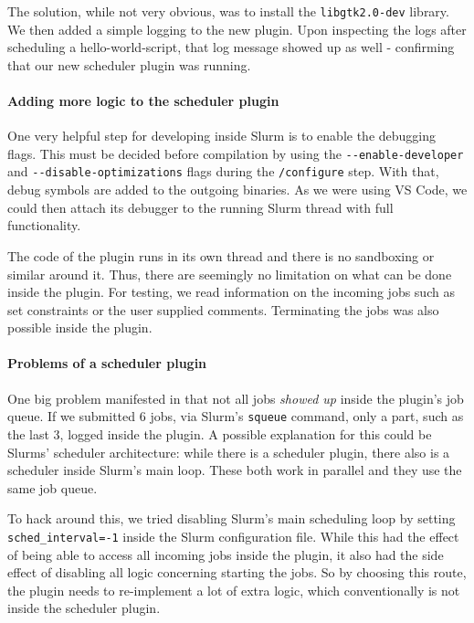 The solution, while not very obvious, was to install the \verb|libgtk2.0-dev| library.
We then added a simple logging to the new plugin. Upon inspecting the logs after scheduling a hello-world-script, that log message showed up as well - confirming that our new scheduler plugin was running.

\paragraph{Adding more logic to the scheduler plugin}

One very helpful step for developing inside Slurm is to enable the debugging flags.
This must be decided before compilation by using the \verb|--enable-developer| and \verb|--disable-optimizations| flags during the \verb|/configure| step. 
With that, debug symbols are added to the outgoing binaries. 
As we were using VS Code, we could then attach its debugger to the running Slurm thread with full functionality.

The code of the plugin runs in its own thread and there is no sandboxing or similar around it.
Thus, there are seemingly no limitation on what can be done inside the plugin. 
For testing, we read information on the incoming jobs such as set constraints or the user supplied comments. Terminating the jobs was also possible inside the plugin.

\paragraph{Problems of a scheduler plugin}

One big problem manifested in that not all jobs \emph{showed up} inside the plugin's job queue. 
If we submitted 6 jobs, via Slurm's \verb|squeue| command, only a part, such as the last 3, logged inside the plugin.
A possible explanation for this could be Slurms' scheduler architecture: while there is a scheduler plugin, there also is a scheduler inside Slurm's main loop. These both work in parallel and they use the same job queue.

To hack around this, we tried disabling Slurm's main scheduling loop by setting \verb|sched_interval=-1| inside the Slurm configuration file. 
While this had the effect of being able to access all incoming jobs inside the plugin, it also had the side effect of disabling all logic concerning starting the jobs.
So by choosing this route, the plugin needs to re-implement a lot of extra logic, which conventionally is not inside the scheduler plugin. 

